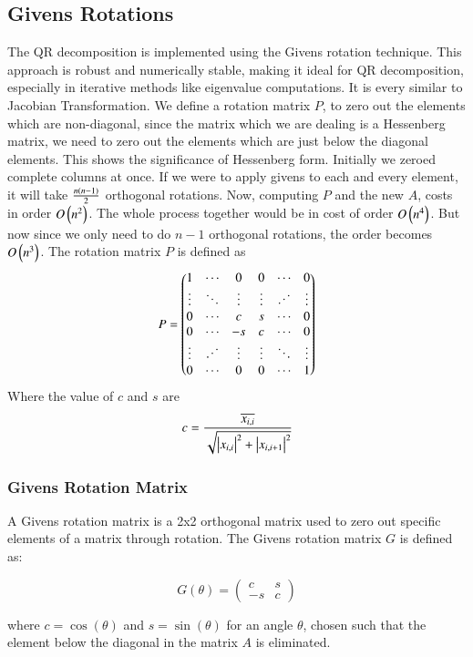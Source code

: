 \documentclass[a4paper,12pt]{article}
\theoremstyle{remark}
\begin{document}
\subsection{Givens Rotations}
The QR decomposition is implemented using the Givens rotation technique. This approach is robust and numerically stable, making it ideal for QR decomposition, especially in iterative methods like eigenvalue computations. It is every similar to Jacobian Transformation. We define a rotation matrix $P$, to zero out the elements which are non-diagonal, since the matrix which we are dealing is a Hessenberg matrix, we need to zero out the elements which are just below the diagonal elements. This shows the significance of Hessenberg form. Initially we zeroed complete columns at once. If we were to apply givens to each and every element, it will take $\frac{n\left(n-1\right)}{2}$ orthogonal rotations. Now, computing $P$ and the new $A$, costs in order $O\left(n^2\right)$. The whole process together would be in cost of order $O\left(n^4\right)$. But now since we only need to do $n-1$ orthogonal rotations, the order becomes $O\left(n^3\right)$. The rotation matrix $P$ is defined as 
\begin{align}
P = \myvec{
1 & \cdots & 0 & 0 & \cdots & 0 \\
\vdots & \ddots & \vdots & \vdots & \reflectbox{$\ddots$} & \vdots \\
0 & \cdots & c & s & \cdots & 0\\
0 & \cdots & -s & c & \cdots & 0\\
\vdots & \reflectbox{$\ddots$} & \vdots & \vdots & \ddots & \vdots\\
0 & \cdots & 0 & 0 & \cdots & 1
}
\end{align}
Where the value of $c$ and $s$ are
\begin{align}
	c = \frac{\overline{x_{i,i}}}{\sqrt{\left\vert x_{i,i}\right\vert^2+\left\vert x_{i,i+1}\right\vert^2}}
\end{align}
\subsubsection{Givens Rotation Matrix}
A Givens rotation matrix is a 2x2 orthogonal matrix used to zero out specific elements of a matrix through rotation. The Givens rotation matrix \( G \) is defined as:

\[
G(\theta) = \begin{pmatrix}
c & s \\
-s & c
\end{pmatrix}
\]

where \( c = \cos(\theta) \) and \( s = \sin(\theta) \) for an angle \( \theta \), chosen such that the element below the diagonal in the matrix \( A \) is eliminated.
\end{document}
